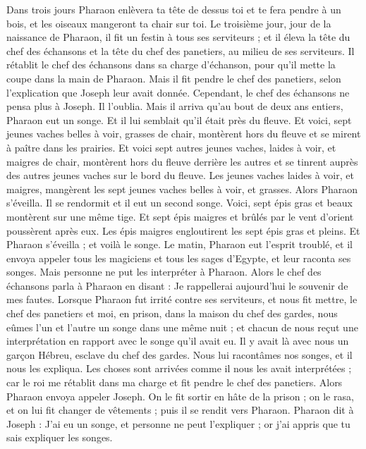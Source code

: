 \begin{multicols}{2}
Dans trois jours Pharaon enlèvera ta tête de dessus toi et te fera pendre à un bois, et les oiseaux mangeront ta chair sur toi.
Le troisième jour, jour de la naissance de Pharaon, il fit un festin à tous ses serviteurs ; et il éleva la tête du chef des échansons et la tête du chef des panetiers, au milieu de ses serviteurs.
Il rétablit le chef des échansons dans sa charge d’échanson, pour qu’il mette la coupe dans la main de Pharaon.
Mais il fit pendre le chef des panetiers, selon l’explication que Joseph leur avait donnée.
Cependant, le chef des échansons ne pensa plus à Joseph. Il l’oublia.
\VerseOne{}Mais il arriva qu’au bout de deux ans entiers, Pharaon eut un songe. Et il lui semblait qu'il était près du fleuve.
Et voici, sept jeunes vaches belles à voir, grasses de chair, montèrent hors du fleuve et se mirent à paître dans les  prairies.
Et voici sept autres jeunes vaches, laides à voir, et maigres de chair, montèrent hors du fleuve derrière les autres et se tinrent auprès des autres jeunes vaches sur le bord du fleuve.
Les jeunes vaches laides à voir, et maigres, mangèrent les sept jeunes vaches belles à voir, et grasses. Alors Pharaon s'éveilla.
Il se rendormit et il eut un second songe. Voici, sept épis gras et beaux montèrent sur une même tige.
Et sept épis maigres et brûlés par le vent d’orient poussèrent après eux.
Les épis maigres engloutirent les sept épis gras et pleins. Et Pharaon s'éveilla ; et voilà le songe.
Le matin, Pharaon eut l’esprit troublé, et il envoya appeler tous les magiciens et tous les sages d'Egypte, et leur raconta ses songes.  Mais personne ne put les interpréter à Pharaon.
Alors le chef des échansons parla à Pharaon en disant : Je rappellerai aujourd'hui le souvenir de mes fautes.
Lorsque Pharaon fut irrité contre ses serviteurs, et nous fit mettre, le chef des panetiers et moi, en prison, dans la maison du chef des gardes,
nous eûmes l’un et l’autre un songe dans une même nuit ; et chacun de nous reçut une interprétation en rapport avec le songe qu’il avait eu.
Il y avait là avec nous un garçon Hébreu, esclave du chef des gardes. Nous lui racontâmes nos songes, et il nous les expliqua.
Les choses sont arrivées comme il nous les avait interprétées ; car le roi me rétablit dans ma charge et fit pendre le chef des panetiers.
Alors Pharaon envoya appeler Joseph.  On le fit sortir en hâte de la prison ; on le rasa, et on lui fit changer de vêtements ; puis il se rendit vers Pharaon.
Pharaon dit à Joseph : J'ai eu un songe, et personne ne peut  l'expliquer ; or j'ai appris que tu sais expliquer les songes.

\end{multicols}
